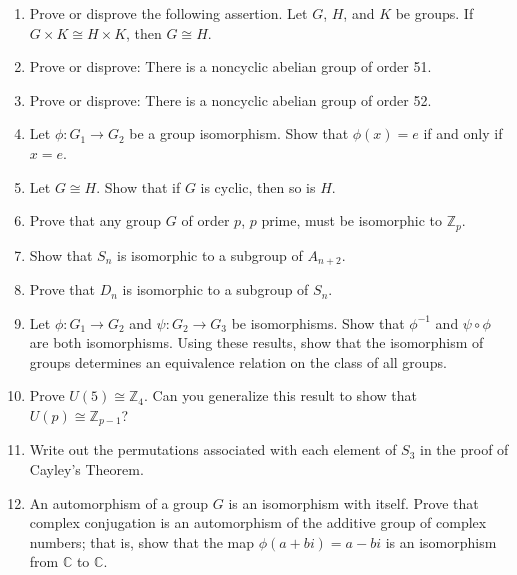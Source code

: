 {\begin{enumerate}
\item
Prove or disprove the following assertion. Let $G$, $H$, and $K$ be
groups. If $G \times K \cong H \times K$, then $G \cong H$. 
 

\item
Prove or disprove: There is a noncyclic abelian group of order 51. 
 

\item
Prove or disprove: There is a noncyclic abelian group of order 52. 
 
 

\item
Let $\phi : G_1 \rightarrow G_2$ be a group isomorphism. Show that
$\phi( x) = e$ if and only if $x=e$. 
 

\item
Let $G \cong H$. Show that if $G$ is cyclic, then so is $H$.
 

\item
Prove that any group $G$ of order $p$, $p$  prime, must be isomorphic
to ${\mathbb Z}_p$. 
 

\item
Show that $S_n$ is isomorphic to a subgroup of $A_{n+2}$.  

\item
Prove that $D_n$ is isomorphic to a subgroup of $S_n$.
 

\item
Let $\phi : G_1 \rightarrow G_2$ and  $\psi : G_2 \rightarrow G_3$  be
isomorphisms. Show that  $\phi^{-1}$ and $\psi \circ \phi$ are both
isomorphisms. Using these results, show that the isomorphism of groups
determines an equivalence relation on the class of all groups.
 

\item
Prove $U(5) \cong {\mathbb Z}_4$. Can you generalize this result to show
that $U(p) \cong {\mathbb Z}_{p-1}$? 
 

\item
Write out the permutations associated with each element of $S_3$ in
the proof of Cayley's Theorem. 
 
 

\item
An {\bfi automorphism\/} of a group $G$ is an isomorphism
with itself. Prove that complex conjugation is an automorphism of the
additive group of complex numbers; that is, show that the map $\phi(
a + bi ) = a - bi$ is an isomorphism from ${\mathbb C}$ to ${\mathbb C}$. 
 


\end{enumerate}}
